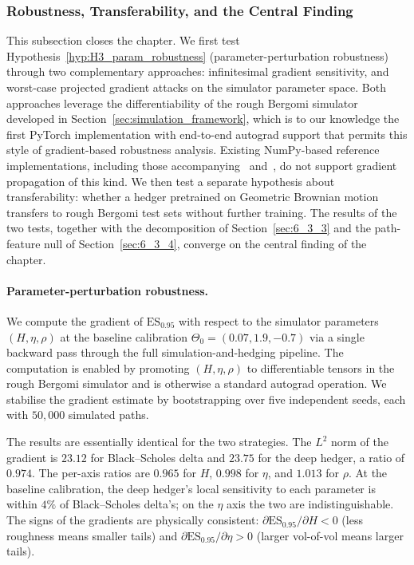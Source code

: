 \documentclass[12pt,a4paper]{article}
\theoremstyle{definition}
\theoremstyle{plain}
\theoremstyle{remark}
\theoremstyle{plain}
\begin{document}
\subsubsection{Robustness, Transferability, and the Central Finding}
\label{sec:6_3_6}

This subsection closes the chapter. We first test
Hypothesis~\ref{hyp:H3_param_robustness} (parameter-perturbation
robustness) through two complementary approaches: infinitesimal
gradient sensitivity, and worst-case projected gradient attacks
on the simulator parameter space. Both approaches leverage the
differentiability of the rough Bergomi simulator developed in
Section~\ref{sec:simulation_framework}, which is to our knowledge
the first PyTorch implementation with end-to-end autograd support
that permits this style of gradient-based robustness analysis.
Existing NumPy-based reference implementations, including those
accompanying~\cite{BayerFriz2016} and~\cite{Horvath2021DeepRough},
do not support gradient propagation of this kind.
We then test a separate hypothesis about transferability: whether
a hedger pretrained on Geometric Brownian motion transfers to
rough Bergomi test sets without further training. The results
of the two tests, together with the decomposition of
Section~\ref{sec:6_3_3} and the path-feature null of
Section~\ref{sec:6_3_4}, converge on the central finding of the
chapter.

\paragraph{Parameter-perturbation robustness.}
We compute the gradient of $\mathrm{ES}_{0.95}$ with respect to
the simulator parameters $(H, \eta, \rho)$ at the baseline
calibration $\Theta_0 = (0.07, 1.9, -0.7)$ via a single backward
pass through the full simulation-and-hedging pipeline. The
computation is enabled by promoting $(H, \eta, \rho)$ to
differentiable tensors in the rough Bergomi simulator and is
otherwise a standard autograd operation. We stabilise the
gradient estimate by bootstrapping over five independent seeds,
each with $50{,}000$ simulated paths.

The results are essentially identical for the two strategies.
The $L^2$ norm of the gradient is $23.12$ for Black--Scholes
delta and $23.75$ for the deep hedger, a ratio of $0.974$. The
per-axis ratios are $0.965$ for $H$, $0.998$ for $\eta$, and
$1.013$ for $\rho$. At the baseline calibration, the deep
hedger's local sensitivity to each parameter is within $4\%$ of
Black--Scholes delta's; on the $\eta$ axis the two are
indistinguishable. The signs of the gradients are physically
consistent:
$\partial \mathrm{ES}_{0.95} / \partial H < 0$ (less roughness
means smaller tails) and
$\partial \mathrm{ES}_{0.95} / \partial \eta > 0$ (larger
vol-of-vol means larger tails).
\end{document}
